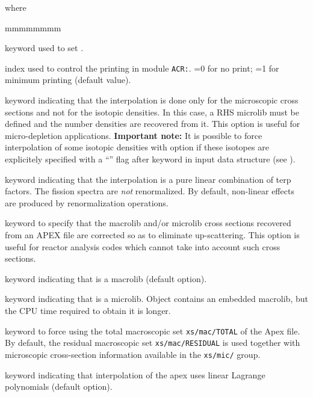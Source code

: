 \noindent where
\begin{ListeDeDescription}{mmmmmmmm}

\item[\moc{EDIT}] keyword used to set .

\item[\dusa{iprint}] index used to control the printing in module {\tt ACR:}. =0 for no print; =1 for minimum printing (default value).
 
\item[\moc{RES}] keyword indicating that the interpolation is done only for the microscopic cross sections and not for the isotopic densities. In this case, a RHS {\sc microlib} must be defined and the number densities are recovered from it. This option is useful for micro-depletion applications. {\bf Important note:} It is possible to force interpolation of some isotopic densities with  option if these
isotopes are explicitely specified with a ``\moc{*}'' flag after  keyword in  input data structure (see ).

\item[\moc{PURE}] keyword indicating that the interpolation is a pure linear combination of terp factors. The fission spectra are {\sl not}
renormalized. By default, non-linear effects are produced by renormalization operations.

\item[\moc{UPS}] keyword to specify that the macrolib and/or microlib cross sections recovered from an APEX file are
corrected so as to eliminate up-scattering. This option is useful for reactor analysis codes which cannot
take into account such cross sections.

\item[\moc{MACRO}] keyword indicating that  is a {\sc macrolib} (default option).

\item[\moc{MICRO}] keyword indicating that  is a {\sc microlib}. Object  contains an embedded {\sc macrolib}, but the CPU time required to obtain it is longer.

\item[\moc{TOTAL}] keyword to force using the total macroscopic set {\tt xs/mac/TOTAL} of the Apex file. By default, the residual
macroscopic set {\tt xs/mac/RESIDUAL} is used together with microscopic cross-section information available in the {\tt xs/mic/} group.

\item[\moc{LINEAR}] keyword indicating that interpolation of the {\sc apex} uses linear Lagrange polynomials (default option).


\end{ListeDeDescription}
